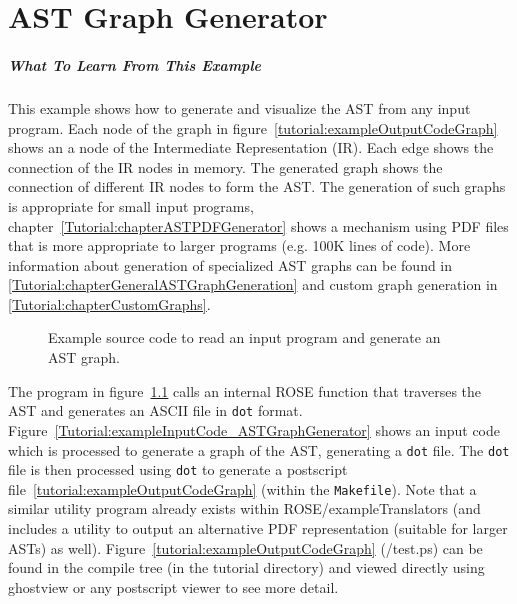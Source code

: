 \chapter{AST Graph Generator}
\label{Tutorial:chapterASTGraphGenerator}

\paragraph{What To Learn From This Example}
This example shows how to generate and visualize the AST from any input program.
Each node of the graph in figure~\ref{tutorial:exampleOutputCodeGraph} shows
an a node of the Intermediate Representation (IR).  Each edge shows the connection
of the IR nodes in memory. The generated graph shows the connection of different 
IR nodes to form the AST.  The generation of such graphs is appropriate for small 
input programs, chapter~\ref{Tutorial:chapterASTPDFGenerator} shows a mechanism 
using PDF files that is more appropriate to larger programs (e.g. 100K lines of code).
More information about generation of specialized AST graphs can be found in 
\ref{Tutorial:chapterGeneralASTGraphGeneration} and custom graph generation in
\ref{Tutorial:chapterCustomGraphs}.

\begin{figure}[!h]
{\indent
{\mySmallFontSize


\begin{latexonly}
   
\end{latexonly}

\begin{htmlonly}
   
\end{htmlonly}

}
}
\caption{Example source code to read an input program and generate an AST graph.}
\label{Tutorial:exampleASTGraphGenerator}
\end{figure}

The program in figure~\ref{Tutorial:exampleASTGraphGenerator} calls 
an internal ROSE function that traverses the AST and generates 
an ASCII file in {\tt dot} format.
Figure~\ref{Tutorial:exampleInputCode_ASTGraphGenerator} shows an input
code which is processed to generate a graph of the AST, generating a 
{\tt dot} file.   The {\tt dot} file is then processed
using {\tt dot} to generate a postscript file~\ref{tutorial:exampleOutputCodeGraph}
(within the {\tt Makefile}).
Note that a similar utility program already exists within ROSE/exampleTranslators
(and includes a utility to output an alternative PDF representation 
(suitable for larger ASTs) as well).  Figure~\ref{tutorial:exampleOutputCodeGraph}
(\TutorialExampleBuildDirectory/test.ps) can be found in the compile 
tree (in the tutorial directory) and viewed directly using ghostview 
or any postscript viewer to see more detail.


